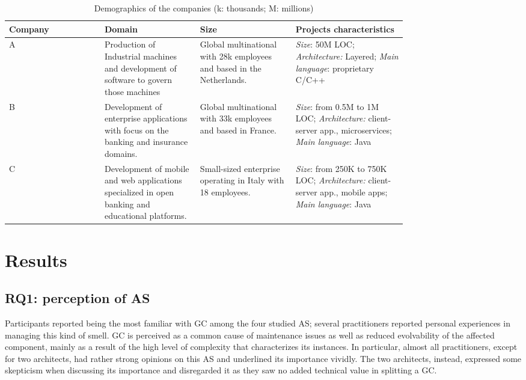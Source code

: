 \begin{table}[]
	\centering
	\footnotesize
	\caption{Demographics of the companies (k: thousands; M: millions)}
	\label{c3:tab:companies}
	\begin{tabular}{p{.08\linewidth}p{0.24\linewidth}p{0.24\linewidth}p{0.29\linewidth}}
	\toprule
	\textbf{Company} & \textbf{Domain} & \textbf{Size} & \textbf{Projects characteristics} \\ \midrule
	A & Production of Industrial machines and development of software to govern those machines & Global multinational with 28k employees and based in the Netherlands. & \textit{Size}: 50M LOC; \textit{Architecture:} Layered; \textit{Main language}: proprietary C/C++ \\
	B & Development of enterprise applications with focus on the banking and insurance domains. & Global multinational with 33k employees and based in France. & \textit{Size}: from 0.5M to 1M LOC; \textit{Architecture:} client-server app., microservices; \textit{Main language}: Java \\
	C & Development of mobile and web applications  specialized in open banking and educational platforms. & Small-sized enterprise operating in Italy with 18 employees. & \textit{Size}: from 250K to 750K LOC; \textit{Architecture:} client-server app., mobile apps; \textit{Main language}: Java \\ \bottomrule
	\end{tabular}
\end{table}

\section{Results}
\subsection{RQ1: perception of AS}
Participants reported being the most familiar with GC among the four studied AS; several practitioners reported personal experiences in managing this kind of smell. GC is perceived as a common cause of maintenance issues as well as reduced evolvability of the affected component, mainly as a result of the high level of complexity that characterizes its instances. In particular, almost all practitioners, except for two architects, had rather strong opinions on this AS and underlined its importance vividly. The two architects, instead, expressed some skepticism when discussing its importance and disregarded it as they saw no added technical value in splitting a GC.

